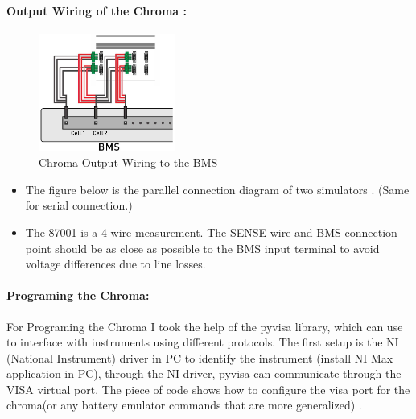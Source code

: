 \paragraph{Output Wiring of the Chroma :}
\begin{figure}[h]
	\centering
	\includegraphics[width=0.4\textwidth]{Chap06/Figures/Chroma_Output_wiring.PNG}
	\caption{Chroma Output Wiring to the BMS} 
	\label{fig:Chroma_Output_wiring}
\end{figure}

\begin{itemize}
    \item The figure below is the parallel connection diagram of two simulators \cite{Chroma_UserManual}. (Same for serial connection.)
    \item The 87001 is a 4-wire measurement. The SENSE wire and BMS connection point should be as close as possible to the BMS input terminal to avoid voltage differences due to line losses.
\end{itemize}

\paragraph{Programing the Chroma:}

For Programing the Chroma I took the help of the pyvisa library, which can use to interface with instruments using different protocols. The first setup is the NI (National Instrument) driver in PC to identify the instrument (install NI Max application in PC), through the NI driver, pyvisa can communicate through the VISA virtual port. The piece of code shows how to configure the visa port for the chroma(or any battery emulator commands that are more generalized) \cite{Chroma_UserManual}.

